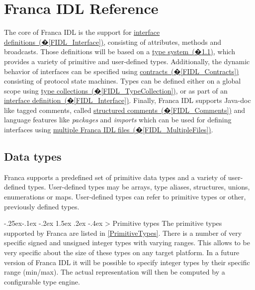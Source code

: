 \documentclass[a4paper,10pt]{scrreprt}
\makeatletter
\renewcommand\subsection{\medskip\@startsection{subsection}{2}{\z@}%
  {-.25ex\@plus -.1ex \@minus -.2ex}%
  {1.5ex \@plus .2ex \@minus -.4ex}%
  {\ifnum \scr@compatibility>\@nameuse{scr@v@2.96}\relax
    \setlength{\parfillskip}{\z@ plus 1fil}\fi
    \raggedsection\normalfont\sectfont\nobreak\size@subsection
  }%
}
\makeatother
\begin{document}
\chapter{Franca IDL Reference}
\label{FrancaIDL}
The core of Franca IDL is the support for \hyperref[FIDL_Interface]{interface definitions~(�\ref*{FIDL_Interface})}, consisting of
attributes, methods and broadcasts. Those definitions will be based on a \hyperref[FIDL_Types]{type system~(�\ref*{FIDL_Types})},
which provides a variety of primitive and user-defined types. 
Additionally, the dynamic behavior of interfaces can be specified using \hyperref[FIDL_Contracts]{contracts~(�\ref*{FIDL_Contracts})}
consisting of protocol state machines.
Types can be defined either on a global scope using \hyperref[FIDL_TypeCollection]{type collections~(�\ref*{FIDL_TypeCollection})},
or as part of an \hyperref[FIDL_Interface]{interface definition~(�\ref*{FIDL_Interface})}.
Finally, Franca IDL supports Java-doc like tagged comments, called \hyperref[FIDL_Comments]{structured comments~(�\ref*{FIDL_Comments})}
and language features like \textit{packages} and \textit{imports} which can be used for defining interfaces using
\hyperref[FIDL_MultipleFiles]{multiple Franca IDL files~(�\ref*{FIDL_MultipleFiles})}.

\section{Data types}
\label{FIDL_Types}
Franca supports a predefined set of primitive data types and a variety of user-defined types.
User-defined types may be arrays, type aliases, structures, unions, enumerations or maps.
User-defined types can refer to primitive types or other, previously defined types. 

\subsection{Primitive types}
\label{FIDL_PrimitiveTypes}
The primitive types supported by Franca are listed in \autoref{PrimitiveTypes}.
There is a number of very specific signed and unsigned integer types with varying ranges.
This allows to be very specific about the size of these types on any target platform.
In a future version of Franca IDL it will be possible to specify integer types by
their specific range (min/max). The actual representation will then be computed 
by a configurable type engine.
\end{document}
